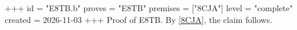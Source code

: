 +++
id = "E8TB.b"
proves = "E8TB"
premises = ["8CJA"]
level = "complete"
created = 2026-11-03
+++
Proof of E8TB. By \ref{8CJA}, the claim follows.
